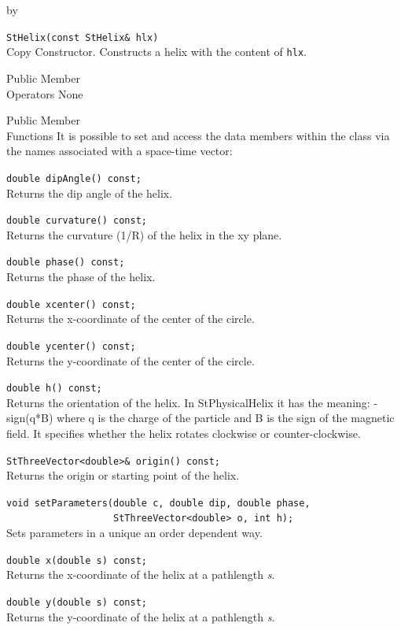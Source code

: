 \documentclass[twoside]{article}
\newcommand{\comp}[1]{\texttt{#1}}%
\newcommand{\args}[1]{\textit{#1}}%
\newcommand{\entrylabel}[1]{\mbox{\textbf{{#1}}}\hfil}%
\newenvironment{entry}
{\begin{list}{}%
    {\renewcommand{\makelabel}{\entrylabel}%
     \setlength{\labelwidth}{90pt}%
     \setlength{\leftmargin}{\labelwidth}
     \advance\leftmargin by \labelsep%
      }%
    }%
  {\end{list}}
\newcommand{\Entrylabel}[1]%
{\raisebox{0pt}[1ex][0pt]{\makebox[\labelwidth][l]%
    {\parbox[t]{\labelwidth}{\hspace{0pt}\textbf{{#1}}}}}}
\newenvironment{Entry}%
{\renewcommand{\entrylabel}{\Entrylabel}\begin{entry}}%
  {\end{entry}}
\begin{document}
\begin{description}
\begin{Entry}
    \verb+StHelix(const StHelix& hlx)+\\
    Copy Constructor. Constructs a helix with the content of \comp{hlx}.
        
\item[Public Member\\ Operators]
    None
  
\item[Public Member\\ Functions]
    It is possible to set and access the data members within the class
    via the names associated with a space-time vector:
  
    \verb+double dipAngle() const;+\\
    Returns the dip angle of the helix.
    
    \verb+double curvature() const;+\\
    Returns the curvature (1/R) of the helix in the xy plane.

    \verb+double phase() const;+\\
    Returns the phase of the helix.
    
    \verb+double xcenter() const;+\\
    Returns the x-coordinate of the center of the circle.

    \verb+double ycenter() const;+\\
    Returns the y-coordinate of the center of the circle.

    \verb+double h() const;+\\
    Returns the orientation of the helix.  In StPhysicalHelix it
    has the meaning: -sign(q*B) where q is the charge of the particle
    and B is the sign of the magnetic field.  It specifies whether
    the helix rotates clockwise or counter-clockwise.
    
    \verb+StThreeVector<double>& origin() const;+\\
    Returns the origin or starting point of the helix.
    
    \verb+void setParameters(double c, double dip, double phase,+\\
    \verb+                   StThreeVector<double> o, int h);+ \\
    Sets parameters in a unique an order dependent way.

    \verb+double x(double s) const;+\\
    Returns the x-coordinate of the helix at a pathlength \args{s}.

    \verb+double y(double s) const;+\\
    Returns the y-coordinate of the helix at a pathlength \args{s}.
    

\end{Entry}
\end{description}
\end{document}
